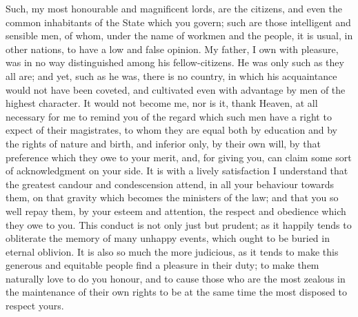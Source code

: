 \documentclass[12pt]{report}
\begin{document}
Such, my most honourable and magnificent lords, are the citizens, and even the common inhabitants of the State which you govern; such are those intelligent and sensible men, of whom, under the name of workmen and the people, it is usual, in other nations, to have a low and false opinion. My father, I own with pleasure, was in no way distinguished among his fellow-citizens. He was only such as they all are; and yet, such as he was, there is no country, in which his acquaintance would not have been coveted, and cultivated even with advantage by men of the highest character. It would not become me, nor is it, thank Heaven, at all necessary for me to remind you of the regard which such men have a right to expect of their magistrates, to whom they are equal both by education and by the rights of nature and birth, and inferior only, by their own will, by that preference which they owe to your merit, and, for giving you, can claim some sort of acknowledgment on your side. It is with a lively satisfaction I understand that the greatest candour and condescension attend, in all your behaviour towards them, on that gravity which becomes the ministers of the law; and that you so well repay them, by your esteem and attention, the respect and obedience which they owe to you. This conduct is not only just but prudent; as it happily tends to obliterate the memory of many unhappy events, which ought to be buried in eternal oblivion. It is also so much the more judicious, as it tends to make this generous and equitable people find a pleasure in their duty; to make them naturally love to do you honour, and to cause those who are the most zealous in the maintenance of their own rights to be at the same time the most disposed to respect yours.
\end{document}
